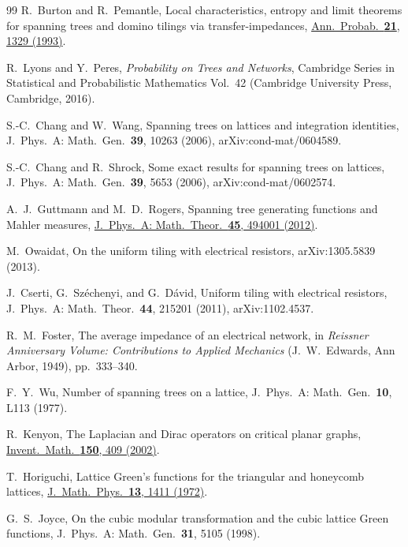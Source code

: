 \documentclass[aps,pre,10pt,twocolumn,superscriptaddress,nofootinbib]{revtex4-2}
\begin{document}
\begin{thebibliography}{99}
R.~Burton and R.~Pemantle,
Local characteristics, entropy and limit theorems for spanning trees and domino tilings via
transfer-impedances,
\href{https://doi.org/10.1214/aop/1176989121}{Ann.\ Probab.\ \textbf{21}, 1329 (1993)}.

R.~Lyons and Y.~Peres,
\emph{Probability on Trees and Networks},
Cambridge Series in Statistical and Probabilistic Mathematics Vol.~42
(Cambridge University Press, Cambridge, 2016).

S.-C.~Chang and W.~Wang,
Spanning trees on lattices and integration identities,
J.\ Phys.\ A: Math.\ Gen.\ \textbf{39}, 10263 (2006),
arXiv:cond-mat/0604589.

S.-C.~Chang and R.~Shrock,
Some exact results for spanning trees on lattices,
J.\ Phys.\ A: Math.\ Gen.\ \textbf{39}, 5653 (2006),
arXiv:cond-mat/0602574.

A.~J.~Guttmann and M.~D.~Rogers,
Spanning tree generating functions and Mahler measures,
\href{https://doi.org/10.1088/1751-8113/45/49/494001}{J.\ Phys.\ A: Math.\ Theor.\ \textbf{45}, 494001 (2012)}.

M.~Owaidat,
On the uniform tiling with electrical resistors,
arXiv:1305.5839 (2013).

J.~Cserti, G.~Sz\'echenyi, and G.~D\'avid,
Uniform tiling with electrical resistors,
J.\ Phys.\ A: Math.\ Theor.\ \textbf{44}, 215201 (2011),
arXiv:1102.4537.

R.~M.~Foster,
The average impedance of an electrical network,
in \emph{Reissner Anniversary Volume: Contributions to Applied Mechanics}
(J.~W.~Edwards, Ann Arbor, 1949), pp.~333--340.

F.~Y.~Wu,
Number of spanning trees on a lattice,
J.\ Phys.\ A: Math.\ Gen.\ \textbf{10}, L113 (1977).

R.~Kenyon,
The Laplacian and Dirac operators on critical planar graphs,
\href{https://doi.org/10.1007/s00222-002-0249-4}{Invent.\ Math.\ \textbf{150}, 409 (2002)}.

T.~Horiguchi,
Lattice Green's functions for the triangular and honeycomb lattices,
\href{https://doi.org/10.1063/1.1666155}{J.\ Math.\ Phys.\ \textbf{13}, 1411 (1972)}.

G.~S.~Joyce,
On the cubic modular transformation and the cubic lattice Green functions,
J.\ Phys.\ A: Math.\ Gen.\ \textbf{31}, 5105 (1998).


\end{thebibliography}
\end{document}
